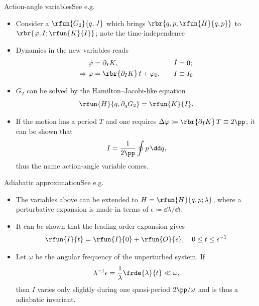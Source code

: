 \documentclass{beamer}
\begin{document}
\begin{frame}{Action-angle variables}{See e.g.\ \cite{Henrard_1993}}
\begin{itemize}
\item Consider a $\rfun{G_2}{q, J}$ which brings $\rbr{q, p; \rfun{H}{q, p}}$ 
to $\rbr{\varphi, I; \rfun{K}{I}}$; note the time-independence
\item Dynamics in the new variables reads
\begin{alignat}{3}
\dot \varphi &= \partial_I K,&\quad \dot I &= 0; \\
\Rightarrow \varphi &= \rbr{\partial_I K}\,t+\varphi_0,&\quad I &\equiv I_0
\end{alignat}
\item $G_2$ can be solved by the Hamilton--Jacobi-like equation
\begin{equation}
\rfun{H}{q, \partial_q G_2} = \rfun{K}{I}.
\end{equation}
\item If the motion has a period $T$ and one requires $\Delta \varphi \coloneqq 
\rbr{\partial_I K}\,T \equiv 2\pp$, it can be shown that
\begin{equation}
I = \frac{1}{2\pp}\oint p\,\dd q,
\end{equation}
thus the name action-angle variable comes.

\end{itemize}
\end{frame}


\begin{frame}{Adiabatic approximation}{See e.g.\ \cite{Henrard_1993}}
\begin{itemize}
\item The variables above can be extended to $H = \rfun{H}{q, p; \lambda}$,
where a perturbative expansion is made in terms of $\epsilon \coloneqq \dd 
\lambda / \dd t$.
\item It can be shown that the leading-order expansion gives
\begin{equation}
\rfun{I}{t} = \rfun{I}{0} +  \rfun{O}{\epsilon},\quad 0 \le t \le 
\epsilon^{-1}
\end{equation}
\item Let $\omega$ be the angular frequency of the unperturbed system. If
\begin{equation}
\lambda^{-1} \epsilon = \frac{1}{\lambda}\frde{\lambda}{t} \ll \omega,
\label{eq:adiab-cond}
\end{equation}
then $I$ varies only slightly during one quasi-period $2\pp/\omega$ and is 
thus a \alert{adiabatic invariant}.

\end{itemize}

\end{frame}
\end{document}

